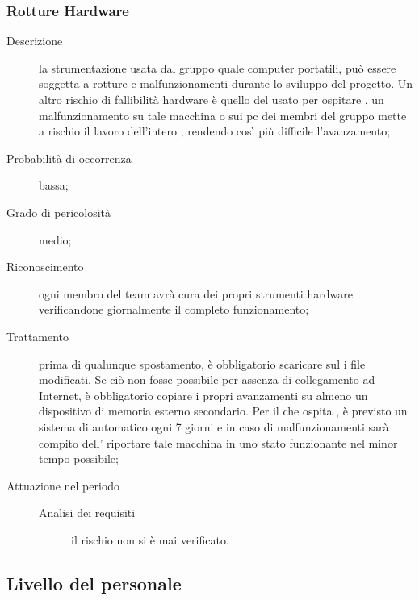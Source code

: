 		\subsubsection{Rotture Hardware}
		\begin{description}
			\item[Descrizione] la strumentazione usata dal gruppo quale computer portatili, può essere soggetta a rotture e malfunzionamenti durante lo sviluppo del progetto. Un altro rischio di fallibilità hardware è quello del  usato per ospitare 				, un malfunzionamento su tale macchina o sui pc dei membri del gruppo mette a rischio il lavoro dell'intero , rendendo così più difficile l'avanzamento;
			\item[Probabilità di occorrenza] bassa;
			\item[Grado di pericolosità] medio;
			\item[Riconoscimento] ogni membro del team avrà cura dei propri strumenti hardware verificandone giornalmente il completo funzionamento;
			\item[Trattamento] prima di qualunque spostamento, è obbligatorio scaricare sul   i file modificati. Se ciò non fosse possibile per assenza di collegamento ad Internet, è obbligatorio copiare i propri avanzamenti su almeno un dispositivo di memoria esterno secondario. Per il  che ospita , è previsto un sistema di  automatico ogni 7 giorni e in caso di malfunzionamenti sarà compito dell’\AM{} riportare tale macchina in uno stato funzionante nel minor tempo possibile; 
			\item[Attuazione nel periodo]
			\begin{description}
				\item[Analisi dei requisiti] il rischio non si è mai verificato.
			\end{description}
		\end{description}
	\subsection{Livello del personale} \label{sec:per}
